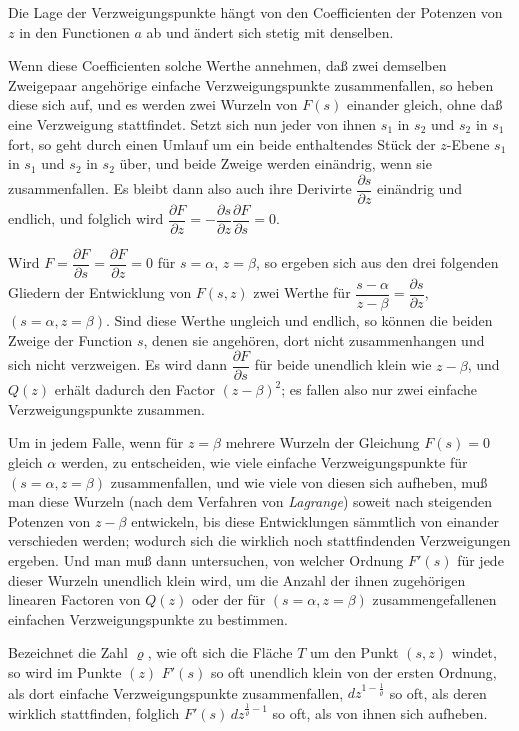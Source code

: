 \documentclass{article}
\begin{document}
Die Lage der Verzweigungspunkte hängt von den Coefficienten der Potenzen von $z$ in den Functionen $a$ ab und ändert sich stetig mit denselben.

Wenn diese Coefficienten solche Werthe annehmen, daß zwei demselben Zweigepaar angehörige einfache Verzweigungspunkte zusammenfallen, so heben diese sich auf, und es werden zwei Wurzeln von $F(s)$ einander gleich, ohne daß eine Verzweigung stattfindet. Setzt sich nun jeder von ihnen $s_{1}$ in $s_{2}$ und $s_{2}$ in $s_{1}$ fort, so geht durch einen Umlauf um ein beide enthaltendes Stück der $z$-Ebene $s_{1}$ in $s_{1}$ und $s_{2}$ in $s_{2}$ über, und beide Zweige werden einändrig, wenn sie zusammenfallen. Es bleibt dann also auch ihre Derivirte $\dfrac{\partial s}{\partial z}$ einändrig und endlich, und folglich wird $\dfrac{\partial F}{\partial z} = -\dfrac{\partial s}{\partial z} \dfrac{\partial F}{\partial s} = 0$.

Wird $F = \dfrac{\partial F}{\partial s} = \dfrac{\partial F}{\partial z} = 0$ für $s = \alpha$, $z = \beta$, so ergeben sich aus den drei folgenden Gliedern der Entwicklung von $F(s, z)$ zwei Werthe für $\dfrac{s-\alpha}{z-\beta} = \dfrac{\partial s}{\partial z}$, $(s = \alpha, z = \beta)$. Sind diese Werthe ungleich und endlich, so können die beiden Zweige der Function $s$, denen sie angehören, dort nicht zusammenhangen und sich nicht verzweigen. Es wird dann $\dfrac{\partial F}{\partial s}$ für beide unendlich klein wie $z-\beta$, und $Q(z)$ erhält dadurch den Factor $(z-\beta)^{2}$; es fallen also nur zwei einfache Verzweigungspunkte zusammen.

Um in jedem Falle, wenn für $z = \beta$ mehrere Wurzeln der Gleichung $F(s) = 0$ gleich $\alpha$ werden, zu entscheiden, wie viele einfache Verzweigungspunkte für $(s = \alpha, z = \beta)$ zusammenfallen, und wie viele von diesen sich aufheben, muß man diese Wurzeln (nach dem Verfahren von \emph{Lagrange}) soweit nach steigenden Potenzen von $z-\beta$ entwickeln, bis diese Entwicklungen sämmtlich von einander verschieden werden; wodurch sich die wirklich noch stattfindenden Verzweigungen ergeben. Und man muß dann untersuchen, von welcher Ordnung $F'(s)$ für jede dieser Wurzeln unendlich klein wird, um die Anzahl der ihnen zugehörigen linearen Factoren von $Q(z)$ oder der für $(s = \alpha, z = \beta)$ zusammengefallenen einfachen Verzweigungspunkte zu bestimmen.

Bezeichnet die Zahl $\varrho$, wie oft sich die Fläche $T$ um den Punkt $(s, z)$ windet, so wird im Punkte $(z)$ $F'(s)$ so oft unendlich klein von der ersten Ordnung, als dort einfache Verzweigungspunkte zusammenfallen, $dz^{1-\frac{1}{\varrho}}$ so oft, als deren wirklich stattfinden, folglich $F'(s)\, dz^{\frac{1}{\varrho}-1}$ so oft, als von ihnen sich aufheben.
\end{document}
